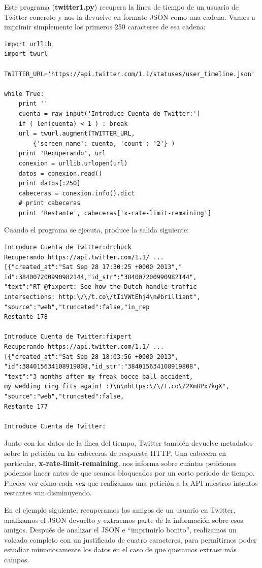 Este programa ({\bf twitter1.py}) recupera la línea de tiempo
de un usuario de Twitter concreto y nos la devuelve en formato
JSON como una cadena. Vamos a imprimir simplemente los primeros 250
caracteres de esa cadena:

\beforeverb
\begin{verbatim}
import urllib
import twurl

TWITTER_URL='https://api.twitter.com/1.1/statuses/user_timeline.json'

while True:
    print ''
    cuenta = raw_input('Introduce Cuenta de Twitter:')
    if ( len(cuenta) < 1 ) : break
    url = twurl.augment(TWITTER_URL,
        {'screen_name': cuenta, 'count': '2'} )
    print 'Recuperando', url
    conexion = urllib.urlopen(url)
    datos = conexion.read()
    print datos[:250]
    cabeceras = conexion.info().dict
    # print cabeceras
    print 'Restante', cabeceras['x-rate-limit-remaining']
\end{verbatim}
\afterverb
%
Cuando el programa se ejecuta, produce la salida siguiente: 
 
\beforeverb
\begin{verbatim}
Introduce Cuenta de Twitter:drchuck
Recuperando https://api.twitter.com/1.1/ ...
[{"created_at":"Sat Sep 28 17:30:25 +0000 2013","
id":384007200990982144,"id_str":"384007200990982144",
"text":"RT @fixpert: See how the Dutch handle traffic 
intersections: http:\/\/t.co\/tIiVWtEhj4\n#brilliant",
"source":"web","truncated":false,"in_rep
Restante 178

Introduce Cuenta de Twitter:fixpert
Recuperando https://api.twitter.com/1.1/ ...
[{"created_at":"Sat Sep 28 18:03:56 +0000 2013",
"id":384015634108919808,"id_str":"384015634108919808",
"text":"3 months after my freak bocce ball accident, 
my wedding ring fits again! :)\n\nhttps:\/\/t.co\/2XmHPx7kgX",
"source":"web","truncated":false,
Restante 177

Introduce Cuenta de Twitter:
\end{verbatim}
\afterverb
%
Junto con los datos de la línea del tiempo, Twitter también devuelve
metadatos sobre la petición en las cabeceras de respuesta HTTP.
Una cabecera en particular, {\bf x-rate-limit-remaining}, nos informa
sobre cuántas peticiones podemos hacer antes de que seamos bloqueados
por un corto periodo de tiempo. Puedes ver cómo cada vez que realizamos
una petición a la API nuestros intentos restantes van disminuyendo.

En el ejemplo siguiente, recuperamos los amigos de un usuario en Twitter,
analizamos el JSON devuelto y extraemos parte de la información
sobre esos amigos. Después de analizar el JSON e ``imprimirlo bonito'',
realizamos un volcado completo con un justificado de cuatro caracteres, para permitirnos
poder estudiar minuciosamente los datos en el caso de que queramos extraer más campos.

